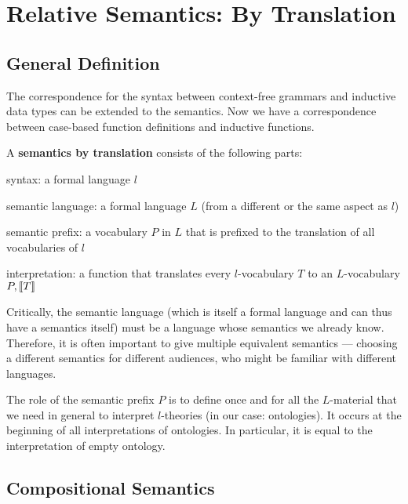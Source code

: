 \section{Relative Semantics: By Translation}

\subsection{General Definition}

The correspondence for the syntax between context-free grammars and inductive data types can be extended to the semantics.
Now we have a correspondence between case-based function definitions and inductive functions.

\begin{definition}
A \textbf{semantics by translation} consists of the following parts:
\begin{compactitem}
 \item syntax: a formal language $l$
 \item semantic language: a formal language $L$ (from a different or the same aspect as $l$)
 \item semantic prefix: a vocabulary $P$ in $L$ that is prefixed to the translation of all vocabularies of $l$
 \item interpretation: a function that translates every $l$-vocabulary $T$ to an $L$-vocabulary $P,\llbracket T\rrbracket$
\end{compactitem}
\end{definition}

Critically, the semantic language (which is itself a formal language and can thus have a semantics itself) must be a language whose semantics we already know.
Therefore, it is often important to give multiple equivalent semantics --- choosing a different semantics for different audiences, who might be familiar with different languages.

The role of the semantic prefix $P$ is to define once and for all the $L$-material that we need in general to interpret $l$-theories (in our case: ontologies).
It occurs at the beginning of all interpretations of ontologies.
In particular, it is equal to the interpretation of empty ontology.

\subsection{Compositional Semantics}

